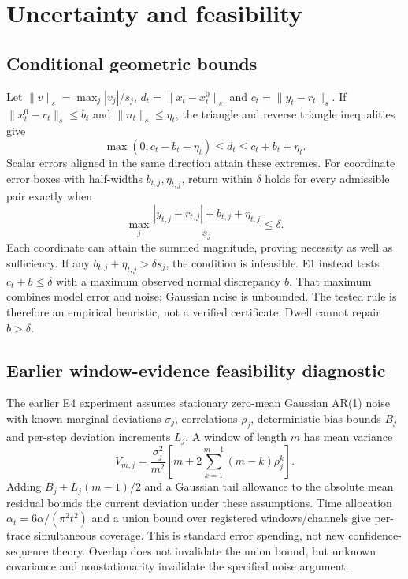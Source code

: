 \section{Uncertainty and feasibility}\label{app:uncertainty}
\subsection{Conditional geometric bounds}
Let $\|v\|_s=\max_j|v_j|/s_j$, $d_t=\|x_t-x_t^0\|_s$ and $c_t=\|y_t-r_t\|_s$. If $\|x_t^0-r_t\|_s\le b_t$ and $\|n_t\|_s\le\eta_t$, the triangle and reverse triangle inequalities give
\begin{equation}
 \max(0,c_t-b_t-\eta_t)\le d_t\le c_t+b_t+\eta_t.\label{eq:bound}
\end{equation}
Scalar errors aligned in the same direction attain these extremes. For coordinate error boxes with half-widths $b_{t,j},\eta_{t,j}$, return within $\delta$ holds for every admissible pair exactly when
\begin{equation}
 \max_j\frac{|y_{t,j}-r_{t,j}|+b_{t,j}+\eta_{t,j}}{s_j}\le\delta.\label{eq:box}
\end{equation}
Each coordinate can attain the summed magnitude, proving necessity as well as sufficiency. If any $b_{t,j}+\eta_{t,j}>\delta s_j$, the condition is infeasible. E1 instead tests $c_t+b\le\delta$ with a maximum observed normal discrepancy $b$. That maximum combines model error and noise; Gaussian noise is unbounded. The tested rule is therefore an empirical heuristic, not a verified certificate. Dwell cannot repair $b>\delta$.

\subsection{Earlier window-evidence feasibility diagnostic}
The earlier E4 experiment assumes stationary zero-mean Gaussian AR(1) noise with known marginal deviations $\sigma_j$, correlations $\rho_j$, deterministic bias bounds $B_j$ and per-step deviation increments $L_j$. A window of length $m$ has mean variance
\begin{equation}
 V_{m,j}=\frac{\sigma_j^2}{m^2}\left[m+2\sum_{k=1}^{m-1}(m-k)\rho_j^k\right].
\end{equation}
Adding $B_j+L_j(m-1)/2$ and a Gaussian tail allowance to the absolute mean residual bounds the current deviation under these assumptions. Time allocation $\alpha_t=6\alpha/(\pi^2t^2)$ and a union bound over registered windows/channels give per-trace simultaneous coverage. This is standard error spending, not new confidence-sequence theory. Overlap does not invalidate the union bound, but unknown covariance and nonstationarity invalidate the specified noise argument.

